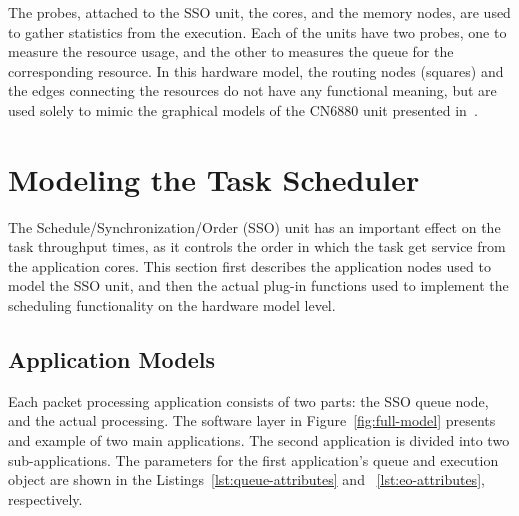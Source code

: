 The probes, attached to the SSO unit, the cores, and the memory nodes, are used to gather statistics from the execution. Each of the units have two probes, one to measure the resource usage, and the other to measures the queue for the corresponding resource. In this hardware model, the routing nodes (squares) and the edges connecting the resources do not have any functional meaning, but are used solely to mimic the graphical models of the CN6880 unit presented in~\cite{cavium:2010:fundamentals}.

\section{Modeling the Task Scheduler}
\label{sec:modeling-task-scheduler}

The Schedule/Synchronization/Order (SSO) unit has an important effect on the task throughput times, as it controls the order in which the task get service from the application cores. This section first describes the application nodes used to model the SSO unit, and then the actual plug-in functions used to implement the scheduling functionality on the hardware model level.








\subsection{Application Models}
\label{application-models}

Each packet processing application consists of two parts: the SSO queue node, and the actual processing. The software layer in Figure~\ref{fig:full-model} presents and example of two main applications. The second application is divided into two sub-applications. The parameters for the first application's queue and execution object are shown in the Listings~\ref{lst:queue-attributes} and ~\ref{lst:eo-attributes}, respectively.


